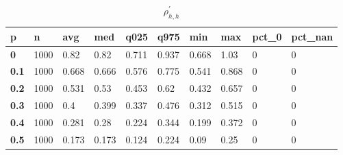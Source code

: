 \begin{table}[h]
 \centering 
\footnotesize
\caption{$\rho_{h,h}^\prime $}
\label{tab:alphahh}
\begin{tabular}[h]{|l|l|l|l|l|l|l|l|l|l|
    } \hline
\textbf{ p} & \textbf{ n} & \textbf{ avg} & \textbf{ med} & \textbf{ q025} & \textbf{ q975} & \textbf{ min} & \textbf{ max} & \textbf{ pct\_0} & \textbf{ pct\_nan}
    \\ \hline
  \textbf{  0} & 1000 &  0.82 &  0.82 & 0.711 & 0.937 & 0.668 &  1.03 & 0 & 0
    \\ \hline
  \textbf{0.1} & 1000 & 0.668 & 0.666 & 0.576 & 0.775 & 0.541 & 0.868 & 0 & 0
    \\ \hline
  \textbf{0.2} & 1000 & 0.531 &  0.53 & 0.453 &  0.62 & 0.432 & 0.657 & 0 & 0
    \\ \hline
  \textbf{0.3} & 1000 &   0.4 & 0.399 & 0.337 & 0.476 & 0.312 & 0.515 & 0 & 0
    \\ \hline
  \textbf{0.4} & 1000 & 0.281 &  0.28 & 0.224 & 0.344 & 0.199 & 0.372 & 0 & 0
    \\ \hline
  \textbf{0.5} & 1000 & 0.173 & 0.173 & 0.124 & 0.224 &  0.09 &  0.25 & 0 & 0
    \\ \hline
 \end{tabular}
 \end{table}
